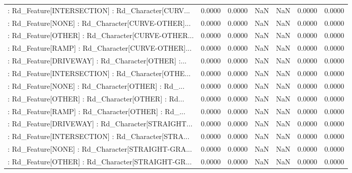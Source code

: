 \begin{longtable}{p{4cm}cccccc}
 : Rd\_Feature[INTERSECTION] : Rd\_Character[CURV... &            0.0000 &            0.0000 &     NaN &          NaN &             0.0000 &            0.0000 \\
 : Rd\_Feature[NONE] : Rd\_Character[CURVE-OTHER]... &            0.0000 &            0.0000 &     NaN &          NaN &             0.0000 &            0.0000 \\
 : Rd\_Feature[OTHER] : Rd\_Character[CURVE-OTHER... &            0.0000 &            0.0000 &     NaN &          NaN &             0.0000 &            0.0000 \\
 : Rd\_Feature[RAMP] : Rd\_Character[CURVE-OTHER]... &            0.0000 &            0.0000 &     NaN &          NaN &             0.0000 &            0.0000 \\
 : Rd\_Feature[DRIVEWAY] : Rd\_Character[OTHER] :... &            0.0000 &            0.0000 &     NaN &          NaN &             0.0000 &            0.0000 \\
 : Rd\_Feature[INTERSECTION] : Rd\_Character[OTHE... &            0.0000 &            0.0000 &     NaN &          NaN &             0.0000 &            0.0000 \\
 : Rd\_Feature[NONE] : Rd\_Character[OTHER] : Rd\_... &            0.0000 &            0.0000 &     NaN &          NaN &             0.0000 &            0.0000 \\
 : Rd\_Feature[OTHER] : Rd\_Character[OTHER] : Rd... &            0.0000 &            0.0000 &     NaN &          NaN &             0.0000 &            0.0000 \\
 : Rd\_Feature[RAMP] : Rd\_Character[OTHER] : Rd\_... &            0.0000 &            0.0000 &     NaN &          NaN &             0.0000 &            0.0000 \\
 : Rd\_Feature[DRIVEWAY] : Rd\_Character[STRAIGHT... &            0.0000 &            0.0000 &     NaN &          NaN &             0.0000 &            0.0000 \\
 : Rd\_Feature[INTERSECTION] : Rd\_Character[STRA... &            0.0000 &            0.0000 &     NaN &          NaN &             0.0000 &            0.0000 \\
 : Rd\_Feature[NONE] : Rd\_Character[STRAIGHT-GRA... &            0.0000 &            0.0000 &     NaN &          NaN &             0.0000 &            0.0000 \\
 : Rd\_Feature[OTHER] : Rd\_Character[STRAIGHT-GR... &            0.0000 &            0.0000 &     NaN &          NaN &             0.0000 &            0.0000 \\

\end{longtable}
